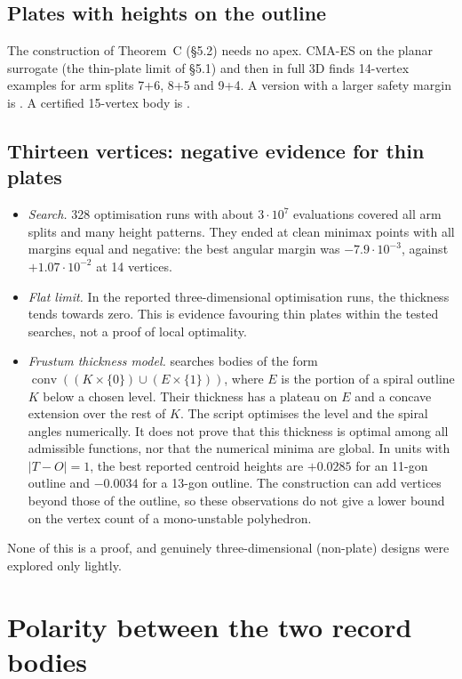 \documentclass[11pt]{amsart}
\newcommand{\conv}{\operatorname{conv}}
\begin{document}
\subsection{Plates with heights on the outline}
The construction of Theorem~C (\S5.2) needs no apex. CMA-ES on the planar surrogate (the thin-plate limit
of \S5.1) and then in full 3D finds 14-vertex examples for arm splits 7+6, 8+5 and 9+4. A version with a
larger safety margin is . A certified 15-vertex body
is .

\subsection{Thirteen vertices: negative evidence for thin plates}
\begin{itemize}
\item \emph{Search.} 328 optimisation runs with about $3\cdot10^7$ evaluations covered all arm splits and
  many height patterns. They ended at clean minimax points with all margins equal and negative: the best
  angular margin was $-7.9\cdot10^{-3}$, against $+1.07\cdot10^{-2}$ at 14 vertices.
\item \emph{Flat limit.} In the reported three-dimensional optimisation runs, the thickness tends towards
  zero. This is evidence favouring thin plates within the tested searches, not a proof of local
  optimality.
\item \emph{Frustum thickness model.}  searches bodies of the form
  $\conv((K\times\{0\})\cup(E\times\{1\}))$, where $E$ is the portion of a spiral outline $K$ below a
  chosen level. Their thickness has a plateau on $E$ and a concave extension over the rest of $K$. The
  script optimises the level and the spiral angles numerically. It does not prove that this thickness is
  optimal among all admissible functions, nor that the numerical minima are global. In units with
  $|T-O|=1$, the best reported centroid heights are $+0.0285$ for an 11-gon outline and $-0.0034$ for a
  13-gon outline. The construction can add vertices beyond those of the outline, so these observations do
  not give a lower bound on the vertex count of a mono-unstable polyhedron.
\end{itemize}
None of this is a proof, and genuinely three-dimensional (non-plate) designs were explored only lightly.

\section{Polarity between the two record bodies}
\end{document}
